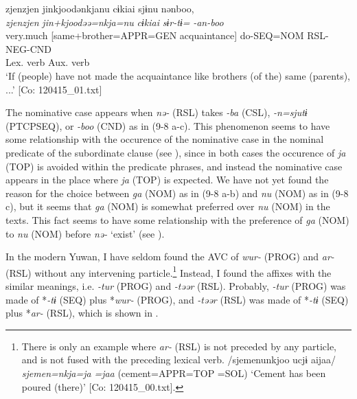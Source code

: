 \ex \label{ex:9.8c} %
     \gllll     zjenzjen  jinkjoodənkjanu  cɨkiai  sjɨnu                                           nənboo,\\
      \textit{zjenzjen}  \textit{jin+kjoodəə=nkja=nu}  \textit{cɨkiai}  \textit{sɨr-tɨ=}          \textit{-an-boo}\\
      very.much  [same+brother=APPR=GEN  acquaintance]  do-SEQ=NOM                                  RSL-NEG-CND\\
        [Complement]    Lex. verb                                                                   Aux. verb\\
      \glt       ‘If (people) have not made the acquaintance like brothers (of the) same (parents), ...’ [Co: 120415\_01.txt]
     \z
\z

The nominative case appears when \textit{nə-} (RSL) takes \textit{-ba} (CSL), \textit{{}-n=sjutɨ} (PTCPSEQ), or \textit{{}-boo} (CND) as in (9-8 a-c). This phenomenon seems to have some relationship with the occurence of the nominative case in the nominal predicate of the subordinate clause (see ), since in both cases the occurence of \textit{ja} (TOP) is avoided within the predicate phrases, and instead the nominative case appears in the place where \textit{ja} (TOP) is expected. We have not yet found the reason for the choice between \textit{ga} (NOM) as in (9-8 a-b) and \textit{nu} (NOM) as in (9-8 c), but it seems that \textit{ga} (NOM) is somewhat preferred over \textit{nu} (NOM) in the texts. This fact seems to have some relationship with the preference of \textit{ga} (NOM) to \textit{nu} (NOM) before \textit{nə-} ‘exist’ (see ).

In the modern Yuwan, I have seldom found the AVC of \textit{wur-} (PROG) and \textit{ar-} (RSL) without any intervening particle.\footnote{There is only an example where \textit{ar-} (RSL) is not preceded by any particle, and is not fused with the preceding lexical verb. /sjemenunkjoo ucjɨ aijaa/ \textit{sjemen=nkja=ja} \textit{} \textit{=jaa} (cement=APPR=TOP  =SOL) ‘Cement has been poured (there)’ [Co: 120415\_00.txt].} Instead, I found the affixes with the similar meanings, i.e. \textit{{}-tur} (PROG) and \textit{{}-təər} (RSL). Probably, \textit{{}-tur} (PROG) was made of *\textit{{}-tɨ} (SEQ) plus *\textit{wur-} (PROG), and \textit{{}-təər} (RSL) was made of *\textit{{}-tɨ} (SEQ) plus *\textit{ar-} (RSL), which is shown in .

